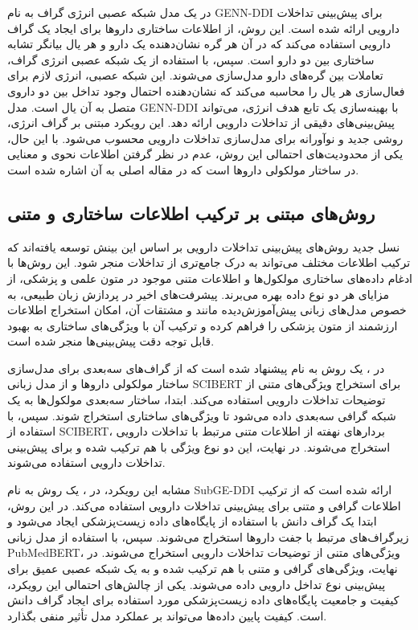 در \cite{ref_xu2019} یک مدل شبکه عصبی انرژی گراف به نام GENN-DDI برای پیش‌بینی تداخلات دارویی ارائه شده است. این روش، از اطلاعات ساختاری داروها برای ایجاد یک گراف دارویی استفاده می‌کند که در آن هر گره نشان‌دهنده یک دارو و هر یال بیانگر تشابه ساختاری بین دو دارو است. سپس، با استفاده از یک شبکه عصبی انرژی گراف، تعاملات بین گره‌های دارو مدل‌سازی می‌شوند. این شبکه عصبی، انرژی لازم برای فعال‌سازی هر یال را محاسبه می‌کند که نشان‌دهنده احتمال وجود تداخل بین دو داروی متصل به آن یال است. مدل GENN-DDI با بهینه‌سازی یک تابع هدف انرژی، می‌تواند پیش‌بینی‌های دقیقی از تداخلات دارویی ارائه دهد. این رویکرد مبتنی بر گراف انرژی، روشی جدید و نوآورانه برای مدل‌سازی تداخلات دارویی محسوب می‌شود. با این حال، یکی از محدودیت‌های احتمالی این روش، عدم در نظر گرفتن اطلاعات نحوی و معنایی در ساختار مولکولی داروها است که در مقاله اصلی \cite{ref_xu2019} به آن اشاره شده است.

\subsection{روش‌های مبتنی بر ترکیب اطلاعات ساختاری و متنی}

نسل جدید روش‌های پیش‌بینی تداخلات دارویی بر اساس این بینش توسعه یافته‌اند که ترکیب اطلاعات مختلف می‌تواند به درک جامع‌تری از تداخلات منجر شود. این روش‌ها با ادغام داده‌های ساختاری مولکول‌ها و اطلاعات متنی موجود در متون علمی و پزشکی، از مزایای هر دو نوع داده بهره می‌برند. پیشرفت‌های اخیر در پردازش زبان طبیعی، به خصوص مدل‌های زبانی پیش‌آموزش‌دیده مانند  و مشتقات آن، امکان استخراج اطلاعات ارزشمند از متون پزشکی را فراهم کرده و ترکیب آن با ویژگی‌های ساختاری به بهبود قابل توجه دقت پیش‌بینی‌ها منجر شده است.

در \cite{ref_he2023}، یک روش به نام  پیشنهاد شده است که از گراف‌های سه‌بعدی برای مدل‌سازی ساختار مولکولی داروها و از مدل زبانی SCIBERT برای استخراج ویژگی‌های متنی از توضیحات تداخلات دارویی استفاده می‌کند. ابتدا، ساختار سه‌بعدی مولکول‌ها به یک شبکه گرافی سه‌بعدی داده می‌شود تا ویژگی‌های ساختاری استخراج شوند. سپس، با استفاده از SCIBERT، بردارهای نهفته از اطلاعات متنی مرتبط با تداخلات دارویی استخراج می‌شوند. در نهایت، این دو نوع ویژگی با هم ترکیب شده و برای پیش‌بینی تداخلات دارویی استفاده می‌شوند.

مشابه این رویکرد، در \cite{ref_shi2024}، یک روش به نام SubGE-DDI ارائه شده است که از ترکیب اطلاعات گرافی و متنی برای پیش‌بینی تداخلات دارویی استفاده می‌کند. در این روش، ابتدا یک گراف دانش با استفاده از پایگاه‌های داده زیست‌پزشکی ایجاد می‌شود و زیرگراف‌های مرتبط با جفت داروها استخراج می‌شوند. سپس، با استفاده از مدل زبانی PubMedBERT، ویژگی‌های متنی از توضیحات تداخلات دارویی استخراج می‌شوند. در نهایت، ویژگی‌های گرافی و متنی با هم ترکیب شده و به یک شبکه عصبی عمیق برای پیش‌بینی نوع تداخل دارویی داده می‌شوند. یکی از چالش‌های احتمالی این رویکرد، کیفیت و جامعیت پایگاه‌های داده زیست‌پزشکی مورد استفاده برای ایجاد گراف دانش است. کیفیت پایین داده‌ها می‌تواند بر عملکرد مدل تأثیر منفی بگذارد.


